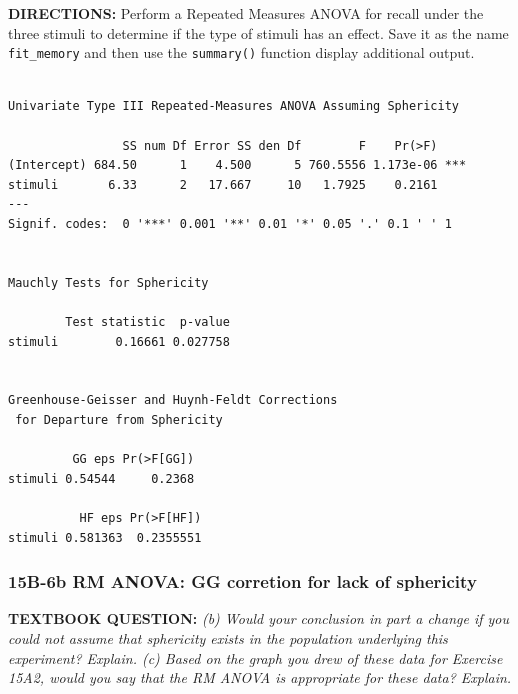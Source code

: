 \documentclass[]{article}
\newenvironment{Shaded}{\begin{snugshade}}{\end{snugshade}}
\newcommand{\KeywordTok}[1]{\textcolor[rgb]{0.13,0.29,0.53}{\textbf{#1}}}
\newcommand{\DataTypeTok}[1]{\textcolor[rgb]{0.13,0.29,0.53}{#1}}
\newcommand{\DecValTok}[1]{\textcolor[rgb]{0.00,0.00,0.81}{#1}}
\newcommand{\StringTok}[1]{\textcolor[rgb]{0.31,0.60,0.02}{#1}}
\newcommand{\CommentTok}[1]{\textcolor[rgb]{0.56,0.35,0.01}{\textit{#1}}}
\newcommand{\OperatorTok}[1]{\textcolor[rgb]{0.81,0.36,0.00}{\textbf{#1}}}
\newcommand{\NormalTok}[1]{#1}
\begin{document}
\textbf{DIRECTIONS:} Perform a Repeated Measures ANOVA for recall under
the three stimuli to determine if the type of stimuli has an effect.
Save it as the name \texttt{fit\_memory} and then use the
\texttt{summary()} function display additional output.

\begin{Shaded}
\end{Shaded}

\begin{verbatim}

Univariate Type III Repeated-Measures ANOVA Assuming Sphericity

                SS num Df Error SS den Df        F    Pr(>F)    
(Intercept) 684.50      1    4.500      5 760.5556 1.173e-06 ***
stimuli       6.33      2   17.667     10   1.7925    0.2161    
---
Signif. codes:  0 '***' 0.001 '**' 0.01 '*' 0.05 '.' 0.1 ' ' 1


Mauchly Tests for Sphericity

        Test statistic  p-value
stimuli        0.16661 0.027758


Greenhouse-Geisser and Huynh-Feldt Corrections
 for Departure from Sphericity

         GG eps Pr(>F[GG])
stimuli 0.54544     0.2368

          HF eps Pr(>F[HF])
stimuli 0.581363  0.2355551
\end{verbatim}

\clearpage

\subsubsection{15B-6b RM ANOVA: GG corretion for lack of
sphericity}\label{b-6b-rm-anova-gg-corretion-for-lack-of-sphericity}

\textbf{TEXTBOOK QUESTION:} \emph{(b) Would your conclusion in part a
change if you could not assume that sphericity exists in the population
underlying this experiment? Explain. (c) Based on the graph you drew of
these data for Exercise 15A2, would you say that the RM ANOVA is
appropriate for these data? Explain.}
\end{document}
